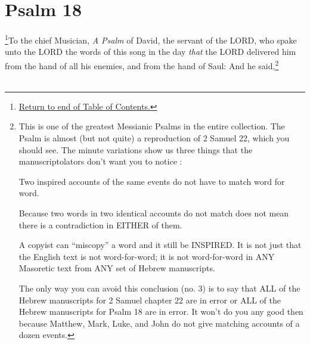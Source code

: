 \chapter{Psalm 18}
\footnote{\textcolor[rgb]{0.00,0.25,0.00}{\hyperlink{TOC}{Return to end of Table of Contents.}}}\textcolor[rgb]{0.00,0.00,1.00}{To the chief Musician, \emph{A Psalm} of David, the servant of the LORD, who spake unto the LORD the words of this song in the day \emph{that} the LORD delivered him from the hand of all his enemies, and from the hand of Saul: And he said,}\footnote{This is one of the greatest Messianic Psalms in the entire collection. The Psalm is almost (but not quite) a reproduction of 2 Samuel 22, which you should see. The minute variations show us three things that the manuscriptolators don’t want you to notice \cite{Ruckman1992Psalms}:\begin{compactenum}
\item Two inspired accounts of the same events do not have to match word for word.
\item Because two words in two identical accounts do not match does not mean there is a contradiction in EITHER of them.
\item A copyist can ``miscopy'' a word and it still be INSPIRED. It is not just that the English text is not word-for-word; it is not word-for-word in ANY Masoretic text from ANY set of Hebrew manuscripts.\end{compactenum}
The only way you can avoid this conclusion (no. 3) is to say that ALL of the Hebrew manuscripts for 2 Samuel chapter 22 are in error or ALL of the Hebrew manuscripts for Psalm 18 are in error. It won’t do you any good then because Matthew, Mark, Luke, and John do not give matching accounts of a dozen events.}\\
\\

